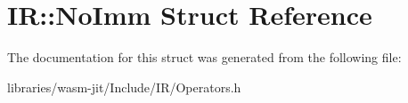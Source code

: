 \hypertarget{struct_i_r_1_1_no_imm}{}\section{IR\+:\+:No\+Imm Struct Reference}
\label{struct_i_r_1_1_no_imm}


The documentation for this struct was generated from the following file\+:\begin{DoxyCompactItemize}
\item 
libraries/wasm-\/jit/\+Include/\+I\+R/Operators.\+h\end{DoxyCompactItemize}
